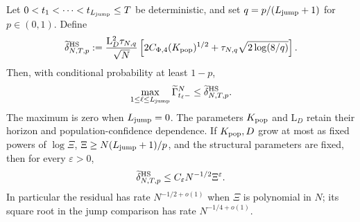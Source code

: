 \begin{corollary}
\label{cor:tilde-gamma-jump-time-union-bound}
Let $0<t_1<\cdots<t_{L_{\mathrm{jump}}}\le T$ be deterministic, and set
$q=p/(L_{\mathrm{jump}}+1)$ for $p\in(0,1)$. Define
\begin{equation}
\label{eq:phase1-HS-tilde-delta-envelope}
 \widetilde\delta_{N,T,p}^{\rm HS}
 :=\frac{\mathrm L_D^2\tau_{N,q}}{\sqrt N}
       \left[2C_{\Phi,4}(K_{\rm pop})^{1/2}
                    +\tau_{N,q}\sqrt{2\log(8/q)}\right].
\end{equation}
Then, with conditional probability at least $1-p$,
\begin{equation}
\label{eq:tilde-gamma-jump-time-union-bound}
 \max_{1\le\ell\le L_{\mathrm{jump}}}\widetilde\Gamma_{t_\ell-}^N
 \le\widetilde\delta_{N,T,p}^{\rm HS}.
\end{equation}
The maximum is zero when $L_{\mathrm{jump}}=0$. The parameters $K_{\rm pop}$ and
$\mathrm L_D$ retain their horizon and population-confidence dependence.
If $K_{\rm pop},D$ grow at most as fixed powers of $\log\Xi$,
$\Xi\ge N(L_{\mathrm{jump}}+1)/p$, and the structural parameters are fixed, then
for every $\varepsilon>0$,
\begin{equation}
\label{eq:tilde-gamma-jump-time-final-rate}
 \widetilde\delta_{N,T,p}^{\rm HS}
 \le C_\varepsilon N^{-1/2}\Xi^\varepsilon.
\end{equation}
In particular the residual has rate $N^{-1/2+o(1)}$ when $\Xi$ is polynomial
in $N$; its square root in the jump comparison has rate $N^{-1/4+o(1)}$.
\end{corollary}
